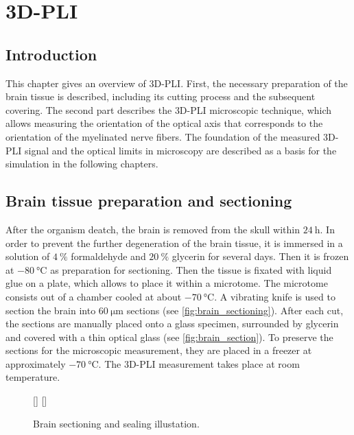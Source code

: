 \cleardoublepage
\setcounter{chapter}{3}
\chapter{3D-PLI}
\label{sec:pli}
%
\section{Introduction}
% 
This chapter gives an overview of \ac{3D-PLI}.
First, the necessary preparation of the brain tissue is described, including its cutting process and the subsequent covering.
The second part describes the \ac{3D-PLI} microscopic technique, which allows measuring the orientation of the optical axis that corresponds to the orientation of the myelinated nerve fibers.
The foundation of the measured \ac{3D-PLI} signal and the optical limits in microscopy are described as a basis for the simulation in the following chapters. 
% 
% 
% 
\section{Brain tissue preparation and sectioning}
% 
After the organism deatch, the brain is removed from the skull within $\SI{24}{\hour}$.
In order to prevent the further degeneration of the brain tissue, it is immersed in a solution of $\SI{4}{\percent}$ formaldehyde and $\SI{20}{\percent}$ glycerin for several days.
Then it is frozen at $\SI{-80}{\celsius}$ as preparation for sectioning.
Then the tissue is fixated with liquid glue on a plate, which allows to place it within a microtome.
The microtome consists out of a chamber cooled at about $\SI{-70}{\celsius}$.
A vibrating knife is used to section the brain into $\SI{60}{\micro\meter}$ sections (see \cref{fig:brain_sectioning}).
After each cut, the sections are manually placed onto a glass specimen, surrounded by glycerin and covered with a thin optical glass (see \cref{fig:brain_section}).
To preserve the sections for the microscopic measurement, they are placed in a freezer at approximately $\SI{-70}{\celsius}$.
The \ac{3D-PLI} measurement takes place at room temperature. \cite{Axer2011}
% 
\begin{figure}[!t]
	\centering
    \setlength{\tikzwidth}{0.475\textwidth}
    [\tikzwidth]{}
    \hfill
    [\tikzwidth]{}
	\caption{Brain sectioning and sealing illustation.}
\end{figure}
% 
% 
% 
